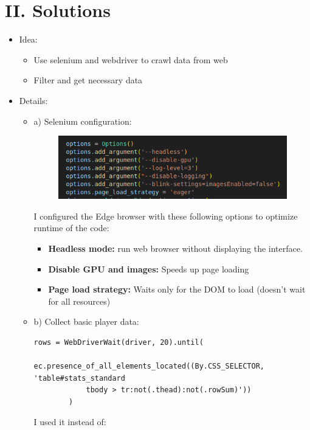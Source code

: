 \documentclass[a4paper,12pt]{article}
\begin{document}
\section*{II. Solutions}
{}
\begin{itemize}[label= {*}, leftmargin= 1cm]
    \subsection*{1) Problem 1}
    \item {\Large Idea:}
    \begin{itemize}[label= {-}, leftmargin= 1cm]
        \item Use selenium and webdriver to crawl data from web
        \item Filter and get necessary data
    \end{itemize}
    \item {\Large Details:}
    \begin{itemize}[label= {}, leftmargin= 1cm]
        \item a) Selenium configuration:

        \begin{figure}[h]
            \centering
            \includegraphics[width=0.7\linewidth]{options.png}
        \end{figure}
        I configured the Edge browser with these following options to optimize runtime of the code:
        \begin{itemize}[label= {-}]
            \item \textbf{Headless mode:} run web browser without displaying the interface.
            \item \textbf{Disable GPU and images:} Speeds up page loading
            \item \textbf{Page load strategy:} Waits only for the DOM to load (doesn't wait for all resources)
        \end{itemize}
        
        \item b) Collect basic player data:

        \begin{Verbatim}[fontsize=\footnotesize, xleftmargin=-1cm]
        rows = WebDriverWait(driver, 20).until(
            ec.presence_of_all_elements_located((By.CSS_SELECTOR, 'table#stats_standard 
            tbody > tr:not(.thead):not(.rowSum)'))
        )   
        \end{Verbatim}
        I used it instead of:
        

\end{itemize}
\end{itemize}
\end{document}
